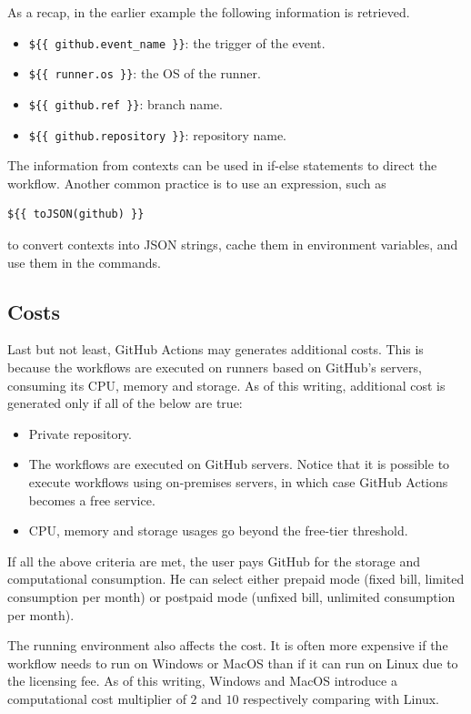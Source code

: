 As a recap, in the earlier example the following information is retrieved.
\begin{itemize}
	\item \verb|${{ github.event_name }}|: the trigger of the event.
	\item \verb|${{ runner.os }}|: the OS of the runner.
	\item \verb|${{ github.ref }}|: branch name.
	\item \verb|${{ github.repository }}|: repository name.
\end{itemize}

The information from contexts can be used in if-else statements to direct the workflow. Another common practice is to use an expression, such as
\begin{lstlisting}
${{ toJSON(github) }}
\end{lstlisting}
to convert contexts into JSON strings, cache them in environment variables, and use them in the commands.

\subsection{Costs}

Last but not least, GitHub Actions may generates additional costs. This is because the workflows are executed on runners based on GitHub's servers, consuming its CPU, memory and storage. As of this writing, additional cost is generated only if all of the below are true:
\begin{itemize}
	\item Private repository.
	\item The workflows are executed on GitHub servers. Notice that it is possible to execute workflows using on-premises servers, in which case GitHub Actions becomes a free service.
	\item CPU, memory and storage usages go beyond the free-tier threshold.
\end{itemize}

If all the above criteria are met, the user pays GitHub for the storage and computational consumption. He can select either prepaid mode (fixed bill, limited consumption per month) or postpaid mode (unfixed bill, unlimited consumption per month).

The running environment also affects the cost. It is often more expensive if the workflow needs to run on Windows or MacOS than if it can run on Linux due to the licensing fee. As of this writing, Windows and MacOS introduce a computational cost multiplier of $2$ and $10$ respectively comparing with Linux.
